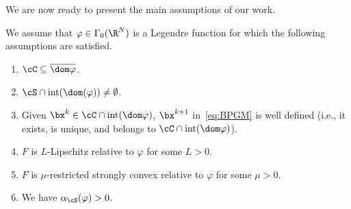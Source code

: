 \documentclass[11pt]{amsart}
\newcommand{\es}[1]{{\color{blue}#1}}
\begin{document}
We are now ready to present the main assumptions of our work.
\begin{assumption}\label{theor assumptions} We assume that $\varphi\in\Gamma_0(\R^N)$ is a Legendre function for which the following assumptions are satisfied.
\begin{enumerate}

\item\label{ass1} $\cC \subseteq \overline{\dom \varphi}$.
\item\label{ass11} $\cS \cap \mathrm{int}(\dom(\varphi)) \neq \emptyset$.
\item\label{ass12} Given $\bx^k \in \cC \cap \mathrm{int}(\dom \varphi)$, $\bx^{k+1}$ in~\eqref{eq:BPGM} is well defined (i.e., it exists, is unique, and belongs to $ \cC \cap \mathrm{int}(\dom \varphi)$).
\item\label{ass2} $F$ is $L$-Lipschitz relative to $\varphi$ for some $L>0$.
\item\label{ass3} $F$ is $\mu$-restricted strongly convex relative to $\varphi$ for some $\mu>0$.
\item\label{ass4} We have $\alpha_\cS(\varphi)>0$.
\end{enumerate}
\end{assumption}
\end{document}
